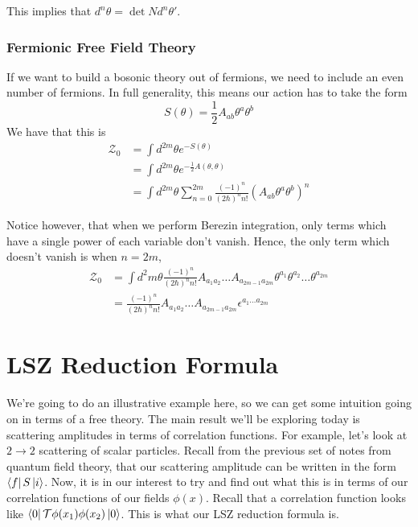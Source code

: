 \documentclass[11pt, oneside]{article}   	%
\theoremstyle{slanted}
\begin{document}
This implies that $ d ^ n  \theta  = \det N d ^ n \theta ' $.

\subsubsection{Fermionic Free Field Theory}
If we 
want to build a bosonic theory out of fermions, 
we need to include an even number of 
fermions. 
In full generality, this 
means our action has to take the form 
\[
 S \left( \theta  \right)  = \frac{1}{2 } A_{ ab } \theta ^ a \theta ^ b 
\] We have that this is 
\begin{align*}
	\mathcal{ Z }_ 0  &=  \int  d^{ 2m } \theta e ^{  - S\left( \theta  \right)   }  \\ 
			  &=  \int d ^{ 2m } \theta e ^{  - \frac{1}{2  } A\left( \theta, \theta  \right) } \\
			  &=  \int d ^{ 2m } \theta 
			  \sum_{ n  =0 } ^{ 2m } \frac{\left(  - 1  \right)  ^ n }{ 
			  \left( 2 \hbar  \right)  ^ n n !  } \left( A _{ ab } \theta ^ a 
		  \theta ^ b \right)  ^ n 
\end{align*}

Notice however, that 
when we perform Berezin integration, 
only terms which 
have a single power of each variable
don't vanish. 
Hence, the only term which doesn't 
vanish is when $ n = 2m $, 
\begin{align*}
	\mathcal{  Z} _ 0 & = 
	\int d ^2m \theta \frac{\left(  - 1  \right)  ^ n  }{ 
	\left( 2 \hbar  \right)  ^ n n ! } A_{ a_1 a_2 } \dots A _{ a_{ 2m - 1 } a _{ 2m } } 
	\theta ^{ a_1 } \theta ^{ a_2 } \dots \theta ^{ a _{ 2m } } \\
			  &=  \frac{\left( - 1  \right)  ^ n }{ 
			  \left( 2 \hbar  \right)  ^ n n ! } A_{ a_1 a_2 } \dots 
			  A_{ a _{ 2m  - 1 } a _{ 2m }  } \epsilon ^{ 
			  a_1 \dots a _{ 2m  } }
\end{align*}


\pagebreak 
\section{LSZ Reduction Formula}
We're going to 
do an illustrative example here, 
so we can get some intuition going on 
in terms of a free theory. 
The main result we'll be exploring 
today is 
scattering amplitudes in terms 
of correlation functions. For example,
let's look at $ 2 \to 2 $ scattering 
of scalar particles. 
Recall from the previous set of notes 
from quantum field theory, that our scattering 
amplitude can be written in the form $ \bra{ f }S\ket{ i } $. 
Now, it is in our interest to try and find out 
what this is in terms of our correlation functions of 
our fields $ \phi \left( x  \right) $. 
Recall that a correlation function looks like $ \bra{0}\mathcal{T }\phi ( x_1 )\phi(x_2 )\ket{0}    $. 
This is what our LSZ reduction formula is. 
\end{document}
